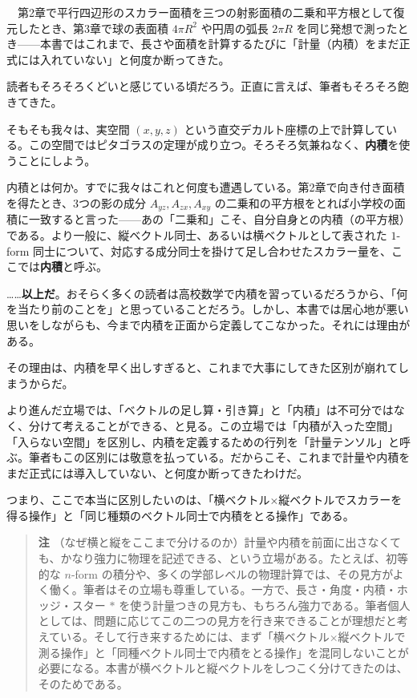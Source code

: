 \documentclass[a4paper,12pt,openany]{book}
\begin{document}
　第2章で平行四辺形のスカラー面積を三つの射影面積の二乗和平方根として復元したとき、第3章で球の表面積
\(4\pi R^2\) や円周の弧長 \(2\pi R\)
を同じ発想で測ったとき——本書ではこれまで、長さや面積を計算するたびに「計量（内積）をまだ正式には入れていない」と何度か断ってきた。

読者もそろそろくどいと感じている頃だろう。正直に言えば、筆者もそろそろ飽きてきた。

そもそも我々は、実空間 \((x,y,z)\)
という直交デカルト座標の上で計算している。この空間ではピタゴラスの定理が成り立つ。そろそろ気兼ねなく、\textbf{内積}を使うことにしよう。

内積とは何か。すでに我々はこれと何度も遭遇している。第2章で向き付き面積を得たとき、3つの影の成分
\(A_{yz}, A_{zx}, A_{xy}\)
の二乗和の平方根をとれば小学校の面積に一致すると言った——あの「二乗和」こそ、自分自身との内積（の平方根）である。より一般に、縦ベクトル同士、あるいは横ベクトルとして表された
\(1\)-form
同士について、対応する成分同士を掛けて足し合わせたスカラー量を、ここでは\textbf{内積}と呼ぶ。

\ldots\ldots{}\textbf{以上だ}。おそらく多くの読者は高校数学で内積を習っているだろうから、「何を当たり前のことを」と思っていることだろう。しかし、本書では居心地が悪い思いをしながらも、今まで内積を正面から定義してこなかった。それには理由がある。

その理由は、内積を早く出しすぎると、これまで大事にしてきた区別が崩れてしまうからだ。

より進んだ立場では、「ベクトルの足し算・引き算」と「内積」は不可分ではなく、分けて考えることができる、と見る。この立場では「内積が入った空間」「入らない空間」を区別し、内積を定義するための行列を「計量テンソル」と呼ぶ。筆者もこの区別には敬意を払っている。だからこそ、これまで計量や内積をまだ正式には導入していない、と何度か断ってきたわけだ。

つまり、ここで本当に区別したいのは、「横ベクトル×縦ベクトルでスカラーを得る操作」と「同じ種類のベクトル同士で内積をとる操作」である。

\begin{quote}
\textbf{注}
（なぜ横と縦をここまで分けるのか）計量や内積を前面に出さなくても、かなり強力に物理を記述できる、という立場がある。たとえば、初等的な
\(n\)-form
の積分や、多くの学部レベルの物理計算では、その見方がよく働く。筆者はその立場も尊重している。一方で、長さ・角度・内積・ホッジ・スター
\(\ast\)
を使う計量つきの見方も、もちろん強力である。筆者個人としては、問題に応じてこの二つの見方を行き来できることが理想だと考えている。そして行き来するためには、まず「横ベクトル×縦ベクトルで測る操作」と「同種ベクトル同士で内積をとる操作」を混同しないことが必要になる。本書が横ベクトルと縦ベクトルをしつこく分けてきたのは、そのためである。
\end{quote}
\end{document}

